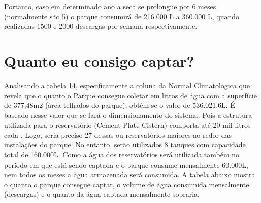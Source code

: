 Portanto, caso em determinado ano a seca se prolongue por 6 meses (normalmente são 5) o parque consumirá de 216.000 L a 360.000 L, quando realizadas 1500 e 2000 descargas por semana respectivamente. 

\section{Quanto eu consigo captar?}

Analisando a tabela 14, especificamente a coluna da Normal Climatológica que revela que o quanto o Parque consegue coletar em litros de água com a superfície de 377,48m2 (área telhados do parque), obtêm-se o valor de 536.021,6L. É baseado nesse valor que se fará o dimensionamento do sistema. Pois a estrutura utilizada para o reservatório (Cement Plate Cistern) comporta até 20 mil litros cada \cite{gnadlinger1999technical}. Logo, seria preciso 27 dessas ou reservatórios maiores ao redor das instalações do parque. No entanto, serão utilizados 8 tanques com capacidade total de 160.000L. Como a água dos reservatórios será utilizada também no período em que está sendo captada e o parque consume mensalmente 60.000L, nem todos os meses a água armazenada será consumida. A tabela abaixo mostra o quanto o parque consegue captar, o volume de água consumida mensalmente (descargas) e o quanto da água captada mensalmente sobraria.

